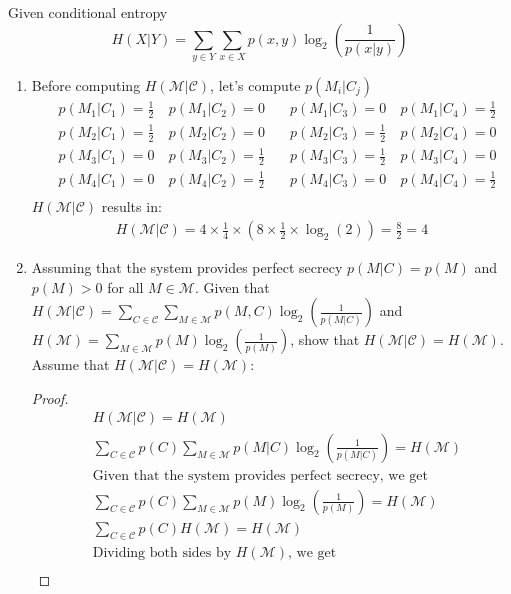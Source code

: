 \documentclass[11pt]{article}
\newcommand{\M}{\mathcal{M}}
\newcommand{\C}{\mathcal{C}}
\newcommand{\logbin}{\log_2}
\theoremstyle{definition}
\begin{document}
Given conditional entropy
\[
  H(X|Y) = \sum_{y \in Y}\sum_{x \in X}p(x, y)\logbin (\frac{1}{p(x|y)})
\]
\begin{enumerate}
  \item
    Before computing $H(\M|\C)$, let's compute $p(M_i|C_j)$
    \begin{equation*}
    \begin{aligned}
      &p(M_1|C_1) = \frac{1}{2}\ &p(M_1|C_2) = 0\quad &p(M_1|C_3) = 0\ &p(M_1|C_4) = \frac{1}{2} \\
      &p(M_2|C_1) = \frac{1}{2}\ &p(M_2|C_2) = 0\quad &p(M_2|C_3) = \frac{1}{2}\ &p(M_2|C_4) = 0 \\
      &p(M_3|C_1) = 0\ &p(M_3|C_2) = \frac{1}{2}\quad &p(M_3|C_3) = \frac{1}{2}\ &p(M_3|C_4) = 0 \\
      &p(M_4|C_1) = 0\ &p(M_4|C_2) = \frac{1}{2}\quad &p(M_4|C_3) = 0\ &p(M_4|C_4) = \frac{1}{2} \\
    \end{aligned}
    \end{equation*}
    $H(\M|\C)$ results in:
    \begin{equation*}
    \begin{aligned}
      H(\M|\C) = 4 \times \frac{1}{4} \times (8 \times \frac{1}{2} \times \logbin (2))
               = \frac{8}{2}
               = 4
    \end{aligned}
    \end{equation*}
  \item
    Assuming that the system provides perfect secrecy $p(M|C) = p(M)$ and $p(M) > 0$ for all $M \in \M$. Given that $H(\M|\C) = \sum_{C \in \C}\sum_{M \in \M}p(M, C)\logbin (\frac{1}{p(M|C)})$ and $H(\M) = \sum_{M \in \M}p(M)\logbin(\frac{1}{p(M)})$, show that $H(\M|\C) = H(\M)$. Assume that $H(\M|\C) = H(\M)$:
    \begin{proof}
      \begin{equation*}
      \begin{aligned}
        & H(\M|\C) = H(\M) \\
        & \sum_{C \in \C}p(C)\sum_{M \in \M}p(M|C)\logbin (\frac{1}{p(M|C)}) = H(\M) \\
        & \text{Given that the system provides perfect secrecy, we get} \\
        & \sum_{C \in \C}p(C)\sum_{M \in \M}p(M)\logbin (\frac{1}{p(M)}) = H(\M) \\
        & \sum_{C \in \C}p(C)H(\M) = H(\M) \\
        & \text{Dividing both sides by $H(\M)$, we get} \\

\end{aligned}
\end{equation*}
\end{proof}
\end{enumerate}
\end{document}
